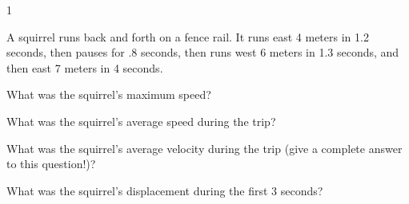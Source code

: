 
\AddToShipoutPicture*{\BackgroundPic}

\addtocounter {ProbNum} {1}

 
{\bf \Large{}}A squirrel runs back and forth on a fence rail.  It runs east 4 meters in 1.2 seconds, then pauses for .8 seconds, then runs west 6 meters in 1.3 seconds, and then east 7 meters in 4 seconds.

\bigskip
What was the squirrel's maximum speed?

\vfill
What was the squirrel's average speed during the trip?

\vfill
What was the squirrel's average velocity during the trip (give a complete answer to this question!)?

\vfill
What was the squirrel's displacement during the first 3 seconds?
 
 
\vfill

\newpage